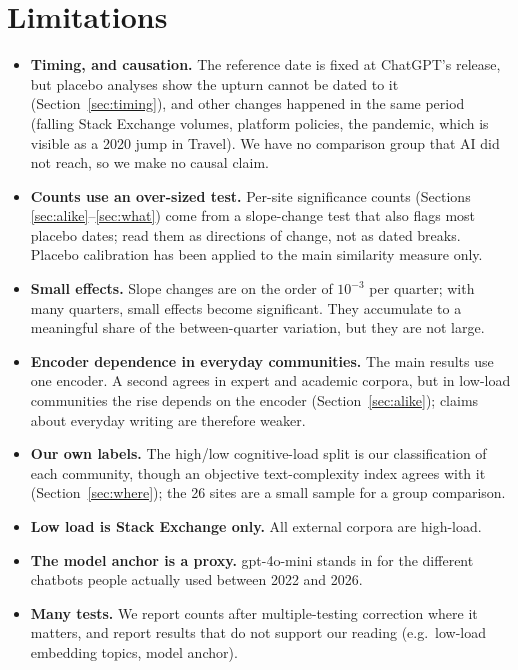 \documentclass[11pt]{article}
\begin{document}
\section{Limitations}

\begin{itemize}
  \item \textbf{Timing, and causation.} The reference date is fixed at ChatGPT's release, but placebo
  analyses show the upturn cannot be dated to it (Section~\ref{sec:timing}), and other changes
  happened in the same period (falling Stack Exchange volumes, platform policies, the pandemic, which
  is visible as a 2020 jump in Travel). We have no comparison group that AI did not reach, so we make
  no causal claim.
  \item \textbf{Counts use an over-sized test.} Per-site significance counts (Sections
  \ref{sec:alike}--\ref{sec:what}) come from a slope-change test that also flags most placebo dates;
  read them as directions of change, not as dated breaks. Placebo calibration has been applied to
  the main similarity measure only.
  \item \textbf{Small effects.} Slope changes are on the order of $10^{-3}$ per quarter; with many
  quarters, small effects become significant. They accumulate to a meaningful share of the
  between-quarter variation, but they are not large.
  \item \textbf{Encoder dependence in everyday communities.} The main results use one encoder. A
  second agrees in expert and academic corpora, but in low-load communities the rise depends on the
  encoder (Section~\ref{sec:alike}); claims about everyday writing are therefore weaker.
  \item \textbf{Our own labels.} The high/low cognitive-load split is our classification of each
  community, though an objective text-complexity index agrees with it (Section~\ref{sec:where}); the
  26 sites are a small sample for a group comparison.
  \item \textbf{Low load is Stack Exchange only.} All external corpora are high-load.
  \item \textbf{The model anchor is a proxy.} gpt-4o-mini stands in for the different chatbots people
  actually used between 2022 and 2026.
  \item \textbf{Many tests.} We report counts after multiple-testing correction where it matters, and
  report results that do not support our reading (e.g.\ low-load embedding topics, model anchor).
\end{itemize}
\end{document}
